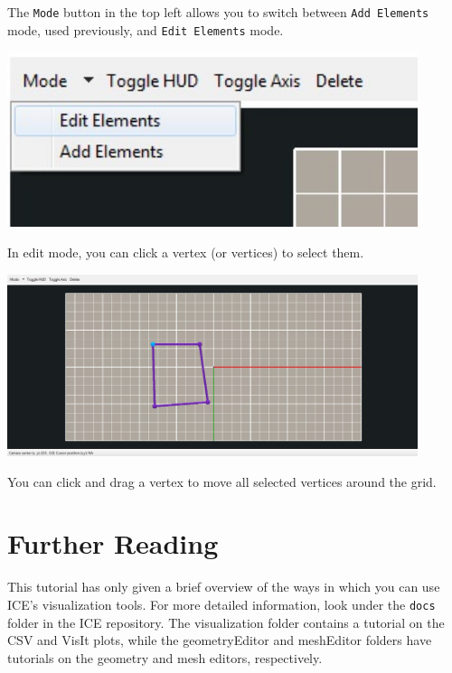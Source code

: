 The \texttt{Mode} button in the top left allows you to switch between
\texttt{Add Elements} mode, used previously, and \texttt{Edit Elements} mode.

\begin{center}
\includegraphics[width=12cm]{images/EditMode}
\end{center}

In edit mode, you can click a vertex (or vertices) to select them. 

\begin{center}
\includegraphics[width=12cm]{images/SelectedVertex}
\end{center}

You can click and drag a vertex to move all selected vertices around the grid.

\section{Further Reading}

This tutorial has only given a brief overview of the ways in which you can use
ICE's visualization tools. For more detailed information, look under the
\texttt{docs} folder in the ICE repository. The visualization folder contains a
tutorial on the CSV and VisIt plots, while the geometryEditor and meshEditor
folders have tutorials on the geometry and mesh editors, respectively. 
